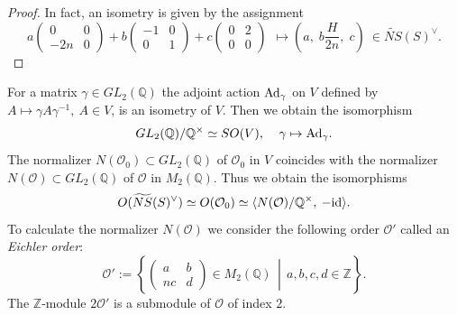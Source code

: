 \documentclass{article}
\theoremstyle{plain}
\theoremstyle{definition}
\theoremstyle{remark}
\newcommand{\Z}{{\mathbb Z}}
\newcommand{\Q}{{\mathbb Q}}
\begin{document}
\begin{proof}
In fact, 
an isometry is given by the assignment 
\begin{equation}\label{isometry between order and NS}
a
\begin{pmatrix}
0 & 0 \\
-2n & 0 
\end{pmatrix} 
+ b  
\begin{pmatrix}
-1 & 0 \\
0 & 1 
\end{pmatrix} 
+ c 
\begin{pmatrix}
0 & 2 \\
0 & 0 
\end{pmatrix} 
\: \: 
\mapsto 
(a, \; b\frac{H}{2n}, \; c) \: \in \widetilde{NS}(S)^{\vee}.
\end{equation}
\end{proof}




For a matrix 
$\gamma \in GL_{2}({\Q})$ 
the adjoint action ${\rm Ad\/}_{\gamma}$ on $V$ defined by 
$A \mapsto \gamma A \gamma ^{-1}, \:  A \in V$,
is an isometry of $V$. 
Then 
we obtain the isomorphism 
\begin{equation*}
GL_{2}({\Q})/{\Q}^{\times} \simeq SO(V),  \: \: \: \: \: 
\gamma \mapsto {\rm Ad\/}_{\gamma} . 
\end{equation*}
The normalizer $N(\mathcal{O}_{0}) \subset GL_{2}({\Q})$ 
of $\mathcal{O}_{0}$ in $V$ 
coincides with 
the normalizer $N(\mathcal{O}) \subset GL_{2}({\Q})$ 
of $\mathcal{O}$ in $M_{2}({\Q})$.  
Thus 
we obtain the isomorphisms 
\begin{equation}\label{isometry and normalizer}
O(\widetilde{NS}(S)^{\vee}) 
\simeq 
O(\mathcal{O}_{0})  
\simeq 
\langle N(\mathcal{O})/{\Q}^{\times}, \: -{\rm id\/} \rangle . 
\end{equation} 
To calculate the normalizer $N(\mathcal{O})$ 
we consider the following order $\mathcal{O}'$ 
called an  
{\it Eichler order\/}: 
\begin{equation}\label{Eichler order}
\mathcal{O}' :=  
\left\{  \left. 
\begin{pmatrix}
  a       & b  \\ 
 nc   & d   
\end{pmatrix} 
\in M_{2}({\Q}) 
\: \: \right|  \: \: 
a, b, c, d \in {\Z} 
\right\} . 
\end{equation}
The ${\Z}$-module $2\mathcal{O}'$ 
is a submodule of $\mathcal{O}$ of index $2$.  
\end{document}
